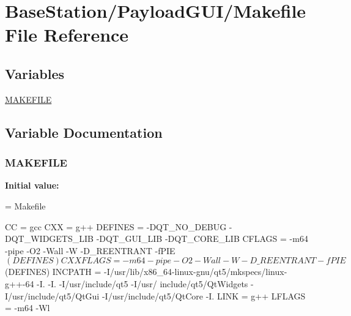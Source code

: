 \hypertarget{BaseStation_2PayloadGUI_2Makefile}{\section{Base\-Station/\-Payload\-G\-U\-I/\-Makefile File Reference}
\label{BaseStation_2PayloadGUI_2Makefile}
}
\subsection*{Variables}
\begin{DoxyCompactItemize}
\item 
\hyperlink{BaseStation_2PayloadGUI_2Makefile_aeab7382b446684a919e9362bcea21b67}{M\-A\-K\-E\-F\-I\-L\-E}
\end{DoxyCompactItemize}


\subsection{Variable Documentation}
\hypertarget{BaseStation_2PayloadGUI_2Makefile_aeab7382b446684a919e9362bcea21b67}{
\subsubsection[{M\-A\-K\-E\-F\-I\-L\-E}]{\setlength{\rightskip}{0pt plus 5cm}M\-A\-K\-E\-F\-I\-L\-E}}\label{BaseStation_2PayloadGUI_2Makefile_aeab7382b446684a919e9362bcea21b67}
{\bfseries Initial value\-:}
\begin{DoxyCode}
= Makefile



CC            = gcc
CXX           = g++
DEFINES       = -DQT\_NO\_DEBUG -DQT\_WIDGETS\_LIB -DQT\_GUI\_LIB -DQT\_CORE\_LIB
CFLAGS        = -m64 -pipe -O2 -Wall -W -D\_REENTRANT -fPIE $(DEFINES)
CXXFLAGS      = -m64 -pipe -O2 -Wall -W -D\_REENTRANT -fPIE $(DEFINES)
INCPATH       = -I/usr/lib/x86\_64-linux-gnu/qt5/mkspecs/linux-g++-64 -I. -I. -I/usr/include/qt5 -I/usr/
      include/qt5/QtWidgets -I/usr/include/qt5/QtGui -I/usr/include/qt5/QtCore -I.
LINK          = g++
LFLAGS        = -m64 -Wl
\end{DoxyCode}
